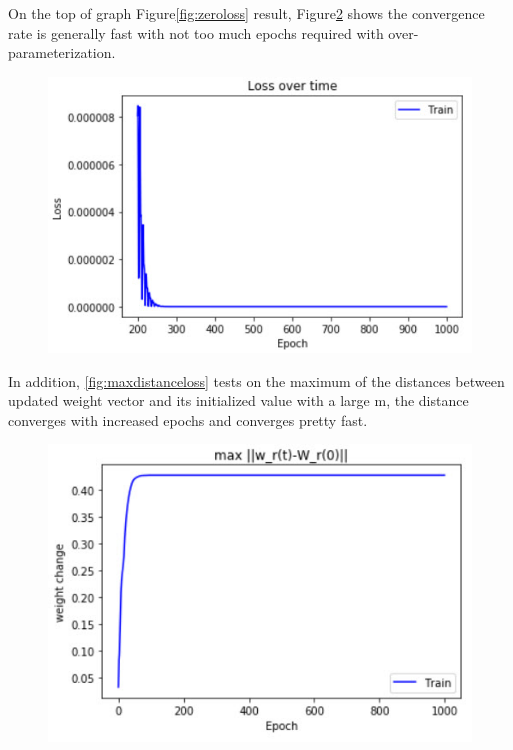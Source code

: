 \documentclass{article}
\begin{document}
On the top of graph Figure\ref{fig:zeroloss} result, Figure\ref{fig:twohundredloss} shows the convergence rate is generally fast with not too much epochs required with over-parameterization. 

\begin{figure}[h]
	\centering
    \includegraphics[scale = 0.5]{pics/overparameterization/loss_over_time_200-1k.jpg}
	\label{fig:twohundredloss}
\end{figure}

In addition, \ref{fig:maxdistanceloss}  tests on the maximum of the distances between updated weight vector and its initialized value  with a large m, the distance converges with increased epochs and converges pretty fast. 

\begin{figure}[h]
	\centering
    \includegraphics[scale = 0.5]{pics/overparameterization/max_weight_change.jpg}
	\label{fig:twohundredloss}
\end{figure}
\end{document}
